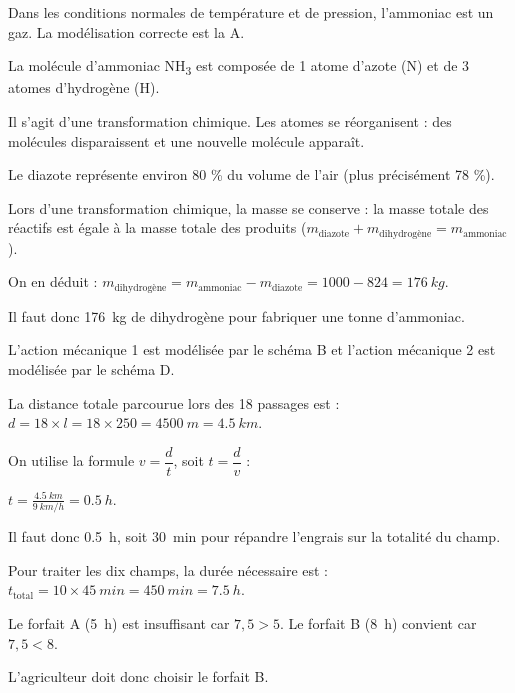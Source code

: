\documentclass[11pt,a4paper]{article}
\begin{document}
\pagination
\titre

\vspace{1em}

\q
Dans les conditions normales de température et de pression, l'ammoniac est un gaz. La modélisation correcte est la A.

\q
La molécule d'ammoniac NH\textsubscript{3} est composée de 1 atome d'azote (N) et de 3 atomes d'hydrogène (H).

\q
Il s'agit d'une transformation chimique. Les atomes se réorganisent : des molécules disparaissent et une nouvelle molécule apparaît.

\q
Le diazote représente environ 80 \% du volume de l'air (plus précisément 78 \%).

\q
Lors d'une transformation chimique, la masse se conserve : la masse totale des réactifs est égale à la masse totale des produits ($m_\text{diazote} + m_\text{dihydrogène} = m_\text{ammoniac}$).

On en déduit : $m_\text{dihydrogène} = m_\text{ammoniac} - m_\text{diazote} = 1000 - 824 = \SI{176}{kg}$.

Il faut donc \SI{176}{kg} de dihydrogène pour fabriquer une tonne d'ammoniac.

\vspace{1.5em}

\q

L'action mécanique 1 est modélisée par le schéma B et l'action mécanique 2 est modélisée par le schéma D.

\q
La distance totale parcourue lors des 18 passages est : $d = 18 \times l = 18 \times 250 = \SI{4500}{m} = \SI{4,5}{km}$.

On utilise la formule $v = \dfrac{d}{t}$, soit $t = \dfrac{d}{v}$ :

$t = \frac{\SI{4,5}{km}}{\SI{9}{km/h}} = \SI{0,5}{h}.$

Il faut donc \SI{0,5}{h}, soit \SI{30}{min} pour répandre l'engrais sur la totalité du champ.

\q
Pour traiter les dix champs, la durée nécessaire est : $t_\text{total} = 10 \times \SI{45}{min} = \SI{450}{min} = \SI{7,5}{h}$.

Le forfait A (\SI{5}{h}) est insuffisant car $7,5 > 5$. Le forfait B (\SI{8}{h}) convient car $7,5 < 8$.

L'agriculteur doit donc choisir le forfait B.
\end{document}
